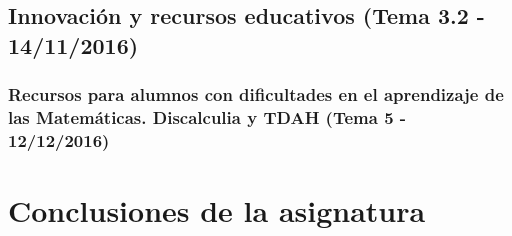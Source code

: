 \subsection{Innovación y recursos educativos (Tema 3.2 - 14/11/2016)}


\subsubsection{Recursos para alumnos con dificultades en el aprendizaje de las Matemáticas. Discalculia y TDAH (Tema 5 - 12/12/2016)}



\newpage
\section{Conclusiones de la asignatura}

